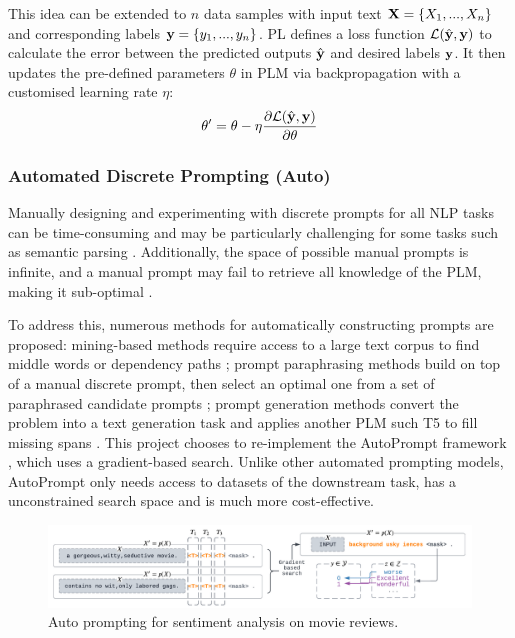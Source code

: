 This idea can be extended to $n$ data samples with input text $\bold{X} = \{X_1, ..., X_n\}$ and corresponding labels $\bold{y} = \{y_1, ..., y_n\}$. PL defines a loss function $\mathcal{L}(\hat{\bold{y}}, \bold{y})$ to calculate the error between the predicted outputs $\hat{\bold{y}}$ and desired labels $\bold{y}$. It then updates the pre-defined parameters $\theta$ in PLM via backpropagation with a customised learning rate $\eta$:
\begin{equation}
    \theta' = \theta - \eta \frac{\partial \mathcal{L}(\hat{\bold{y}}, \bold{y})}{\partial \theta}
\end{equation}

\subsubsection{Automated Discrete Prompting (Auto)}
Manually designing and experimenting with discrete prompts for all NLP tasks can be time-consuming and may be particularly challenging for some tasks such as semantic parsing \cite{Shin21Auto}. Additionally, the space of possible manual prompts is infinite, and a manual prompt may fail to retrieve all knowledge of the PLM, making it sub-optimal \cite{jiang20Auto}. 

To address this, numerous methods for automatically constructing prompts are proposed: mining-based methods require access to a large text corpus to find middle words or dependency paths \cite{jiang20Auto}; prompt paraphrasing methods build on top of a manual discrete prompt, then select an optimal one from a set of paraphrased candidate prompts \cite{Yuan21Auto};  prompt generation methods convert the problem into a text generation task and applies another PLM such T5 to fill missing spans \cite{Ben-David21Auto}. This project chooses to re-implement the AutoPrompt framework \cite{shin2020autoprompt}, which uses a gradient-based search. Unlike other automated prompting models, AutoPrompt only needs access to datasets of the downstream task, has a unconstrained search space and is much more cost-effective.

\vspace{-0.5em}
\begin{figure}[!ht]
    \centering
    \includegraphics[width=\hsize]{figures/preparation_media/prepare-auto.pdf}
    \caption{Auto prompting for sentiment analysis on movie reviews.}
    \label{fig:prepare-auto}
\end{figure}


